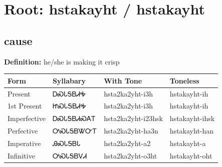 \documentclass{article}%
\begin{document}
%
\normalsize%
\section*{Root: hstakayht / hstakayht}%
\subsection*{cause}%
\textbf{Definition: }%
he/she is making it crisp%
\\[0.5em]%
\begin{tabular}{|l|l|l|l|}%
\hline%
\textbf{Form}&\textbf{Syllabary}&\textbf{With Tone}&\textbf{Toneless}\\%
\hline%
Present&ᎠᏍᏓᎦᏴᏗᎭ&hsta2ka2yht{-}i3h&hstakayht{-}ih\\%
1st Present&ᏥᏍᏓᎦᏴᏗᎭ&hsta2ka2yht{-}i3h&hstakayht{-}ih\\%
Imperfective&ᎠᏍᏓᎦᏴᏗᏍᎪᎢ&hsta2ka2yht{-}i23hsk&hstakayht{-}ihsk\\%
Perfective&ᎤᏍᏓᎦᏴᏔᏅᎢ&hsta2ka2yht{-}ha3n&hstakayht{-}han\\%
Imperative&ᎯᏍᏓᎦᏴᏓ&hsta2ka2yht{-}a2&hstakayht{-}a\\%
Infinitive&ᎤᏍᏓᎦᏴᏙᏗ&hsta2ka2yht{-}o3ht&hstakayht{-}oht\\%
\hline%
\end{tabular}%
\\[1em]%
\end{document}
